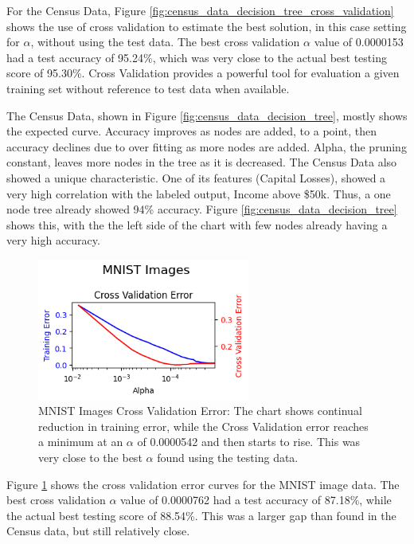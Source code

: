 \documentclass[letterpaper]{article} %
\begin{document}
For the Census Data, Figure \ref{fig:census_data_decision_tree_cross_validation} shows the use of cross validation to estimate the best solution, in this case setting for $\alpha$, without using the test data.   The best cross validation $\alpha$ value of 0.0000153 had a test accuracy of 95.24\%, which was very close to the actual best testing score of 95.30\%.  Cross Validation provides a powerful tool for evaluation a given training set without reference to test data when available.

The Census Data, shown in Figure \ref{fig:census_data_decision_tree},  mostly shows the expected curve.  Accuracy improves as nodes are added, to a point, then accuracy declines due to over fitting as more nodes are added.  Alpha, the pruning constant, leaves more nodes in the tree as it is decreased.  The Census Data also showed a unique characteristic.  One of its features (Capital Losses), showed a very high correlation with the labeled output, Income above \$50k.  Thus, a one node tree already showed 94\% accuracy.  Figure \ref{fig:census_data_decision_tree} shows this, with the the left side of the chart with few nodes already having a very high accuracy.  


\begin{figure}[htb]
\centering
\includegraphics[width=2.75in]{figures/MNIST_Images_decision_tree_cross_validation.png}
\caption{MNIST Images Cross Validation Error:  The chart shows continual reduction in training error, while the Cross Validation error reaches a minimum at an $\alpha$ of 0.0000542 and then starts to rise.  This was very close to the best $\alpha$ found using the testing data. }
\label{fig:MNIST_Images_decision_tree_cross_validation}
\end{figure}

Figure \ref{fig:MNIST_Images_decision_tree_cross_validation}  shows the cross validation error curves for the MNIST image data.  The best cross validation $\alpha$ value of 0.0000762 had a test accuracy of 87.18\%,  while the actual best testing score of 88.54\%.  This was a larger gap than found in the Census data, but still relatively close.
\end{document}
